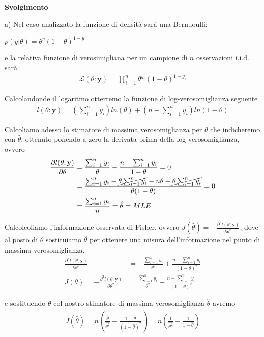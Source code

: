 \textbf{Svolgimento}
\\
\bigskip

a) Nel caso analizzato la funzione di densità sarà una Bernuoulli:
\begin{center}
$p(y|\theta)=\theta^{y}(1-\theta)^{1-y}$
\end{center}

e la relativa funzione di verosimigliana per un campione di $n$ osservazioni i.i.d. sarà 
\begin{align*}
\mathcal{L}(\theta: \textbf{y})=\prod_{i=1}^n\theta^{y_i}(1-\theta)^{1-y_i}
\end{align*}

Calcolandonde il logaritmo otterremo la funzione di log-verosomiglianza seguente
\begin{align*}
l(\theta:\textbf{y})=\left(\sum_{i=1}^n y_{i}\right)ln(\theta)+\left(n-\sum_{i=1}^n y_{i}\right)ln(1-\theta)
\end{align*}

Calcoliamo adesso lo stimatore di massima verosomiglianza per $\theta$ che indicheremo con $\hat{\theta}$, ottenuto ponendo a zero la derivata prima della log-verosomiglianza, ovvero
\begin{align*}
\frac{\partial l(\theta;\textbf{y})}{\partial\theta}&=\frac{\sum_{i=1}^{n}y_i}{\theta}-\frac{n-\sum_{i=1}^{n}y_i}{1-\theta}= 0\\
&= \frac{\sum_{i=1}^{n}y_i -
\cancel{\theta\sum_{i=1}^{n}y_i} -
n\theta +
\cancel{\theta\sum_{i=1}^{n}y_i}}
{\theta(1-\theta)} = 0 \\
&=\frac{\sum_{i=1}^{n}y_i}{n} = \hat{\theta} = MLE
\end{align*}

Calcolcoliamo l'informazione osservata di Fisher, ovvero $J(\hat{\theta}) = -\frac{\partial^2 l(\theta;\textbf{y})}{\partial\theta^2}$, dove al posto di $\theta$ sostituiamo $\hat{\theta}$ per ottenere una misura dell'informazione nel punto di massima verosomiglianza.
\begin{align*}
\frac{\partial^2 l(\theta;\textbf{y})}{\partial\theta^2} &= -\frac{\sum_{i=1}^{n}y_i}{\theta^2}+\frac{n-\sum_{i=1}^{n}y_i}{(1-\theta)^2}\\
J(\theta) = -\frac{\partial^2 l(\theta;\textbf{y})}{\partial\theta^2} &= \frac{\sum_{i=1}^{n}y_i}{\theta^2}-\frac{n-\sum_{i=1}^{n}y_i}{(1-\theta)^2}
\end{align*}

e sostituendo $\theta$ col nostro stimatore di massima verosomiglianza $\hat{\theta}$ avremo
\begin{align*}
J(\hat{\theta}) = n\left(\frac{\hat{\theta}}{\hat{\theta^2}} - 
\frac{1- \hat{\theta}}{(1- \hat{\theta})^2}\right)
= n\left(\frac{1}{\hat{\theta^2}} -
\frac{ 1 }{1- \hat{\theta}}\right)
\end{align*}

